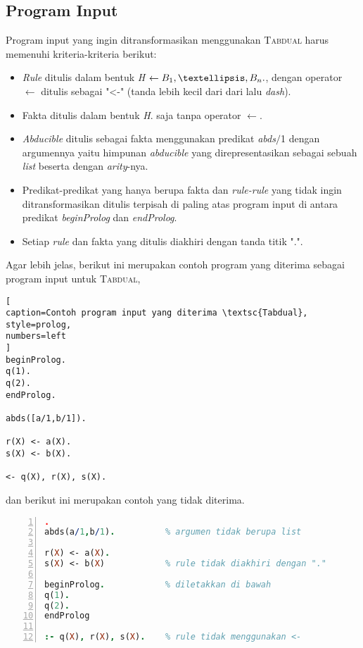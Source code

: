 \subsection{Program Input}
Program input yang ingin ditransformasikan menggunakan \textsc{Tabdual} harus memenuhi kriteria-kriteria berikut:

\begin{itemize}
	\item \textit{Rule} ditulis dalam bentuk \textit{H $\leftarrow B_1, \textellipsis,B_n.$}, dengan operator $\leftarrow$ ditulis sebagai "<-" (tanda lebih kecil dari dari lalu \textit{dash}).
	\item Fakta ditulis dalam bentuk \textit{H}. saja tanpa operator $\leftarrow$.
	\item \textit{Abducible} ditulis sebagai fakta menggunakan predikat \textit{abds$/$}1 dengan argumennya yaitu himpunan \textit{abducible} yang direpresentasikan sebagai sebuah \textit{list} beserta dengan \textit{arity}-nya.
	\item Predikat-predikat yang hanya berupa fakta dan \textit{rule-rule} yang tidak ingin ditransformasikan ditulis terpisah di paling atas program input di antara predikat \textit{beginProlog} dan \textit{endProlog}. 
	\item Setiap \textit{rule} dan fakta yang ditulis diakhiri dengan tanda titik ".".
\end{itemize}

\noindent Agar lebih jelas, berikut ini merupakan contoh program yang diterima sebagai program input untuk \textsc{Tabdual},
\\

\begin{lstlisting}[
caption=Contoh program input yang diterima \textsc{Tabdual},
style=prolog,
numbers=left
]
beginProlog.
q(1).
q(2).
endProlog.

abds([a/1,b/1]).

r(X) <- a(X).
s(X) <- b(X).

<- q(X), r(X), s(X).
\end{lstlisting}

\noindent dan berikut ini merupakan contoh yang tidak diterima.
\\

\begin{lstlisting}[language=Prolog,
caption=Contoh program input yang tidak diterima \textsc{Tabdual},
style=prolog,
numbers=left
].
abds(a/1,b/1).			% argumen tidak berupa list

r(X) <- a(X).
s(X) <- b(X)			% rule tidak diakhiri dengan "."

beginProlog.			% diletakkan di bawah
q(1).
q(2).
endProlog

:- q(X), r(X), s(X).	% rule tidak menggunakan <-
\end{lstlisting}

